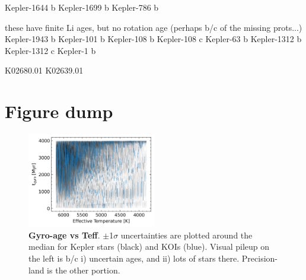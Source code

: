 \documentclass[11pt,twocolumn,tighten]{aastex63}
\begin{document}
Kepler-1644 b
Kepler-1699 b
 Kepler-786 b

these have finite Li ages, but no rotation age (perhaps b/c of the missing prots...)
Kepler-1943 b
 Kepler-101 b
 Kepler-108 b
 Kepler-108 c
  Kepler-63 b
Kepler-1312 b
Kepler-1312 c
   Kepler-1 b

K02680.01
K02639.01





\section{Figure dump}

\begin{figure}[!t]
	\begin{center}
		\leavevmode
		\includegraphics[width=0.5\textwidth]{gyroage_vs_teff_errs_showplanets_linear.png}
	\end{center}
	\vspace{-0.6cm}
	\caption{
		{\bf Gyro-age vs Teff}.
		$\pm$1$\sigma$ uncertainties are plotted around the median for Kepler stars (black) and KOIs (blue).
		Visual pileup on the left is b/c i) uncertain ages, and ii) lots of stars there.  Precision-land is the other portion.
		\label{fig:gyroage_vs_teff}
	}
\end{figure}

\clearpage
\listofchanges
\end{document}
